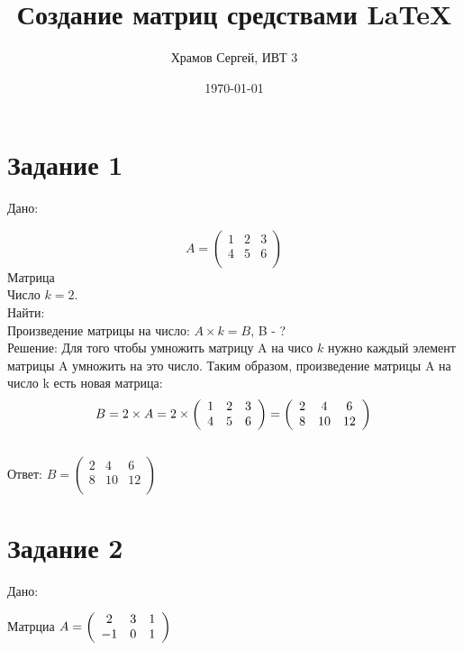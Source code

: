 \documentclass[a4paper,12pt]{article} %
\author{Храмов Сергей, ИВТ 3}
\title{Создание матриц средствами \LaTeX{}}
\date{\today}
\begin{document}
\maketitle
\newpage
\section{Задание 1}

Дано:

\begin{displaymath}
{A} =
\left( \begin{array}{ccc}
1 & 2 & 3 \\
4 & 5 & 6 \\
\end{array} \right)
\end{displaymath}
Матрица\\
Число $k=2$.\\
Найти:\\
Произведение матрицы на число: $A \times k = B$, B - ?\\
Решение:
Для того чтобы умножить матрицу A на чисо $k$ нужно каждый элемент матрицы A умножить на это число. Таким образом, произведение матрицы A на число k есть новая матрица:\\
\begin{displaymath}    
B = 2 \times A = 2 \times  \left( \begin{array}{ccc}
1 & 2 & 3 \\
4 & 5 & 6 \\
\end{array} \right) = \left( \begin{array}{ccc}
2 & 4 & 6 \\
8 & 10 & 12 \\
\end{array} \right) \\ 
\end{displaymath}\\
Ответ:
${B} =  \left( \begin{array}{ccc}
2 & 4 & 6 \\
8 & 10 & 12 \\\end{array} \right)$

\section{Задание 2}

Дано:

Матрциа ${A} =
\left( \begin{array}{ccc}
2 & 3 & 1 \\
-1 & 0 & 1 \\
\end{array} \right)\\$
\end{document}
